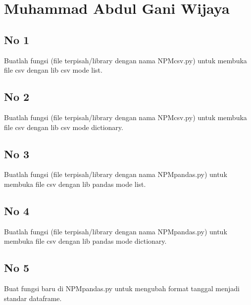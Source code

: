 \section{Muhammad Abdul Gani Wijaya}
\subsection{No 1}
Buatlah  fungsi  (file  terpisah/library  dengan  nama  NPMcsv.py)  untuk  membuka file csv dengan lib csv mode list.



\subsection{No 2}
Buatlah  fungsi  (file  terpisah/library  dengan  nama  NPMcsv.py)  untuk  membuka file csv dengan lib csv mode dictionary.



\subsection{No 3}
Buatlah fungsi (file terpisah/library dengan nama NPMpandas.py) untuk membuka file csv dengan lib pandas mode list.



\subsection{No 4}
Buatlah fungsi (file terpisah/library dengan nama NPMpandas.py) untuk membuka file csv dengan lib pandas mode dictionary.



\subsection{No 5}
Buat fungsi baru di NPMpandas.py untuk mengubah format tanggal menjadi standar dataframe.

